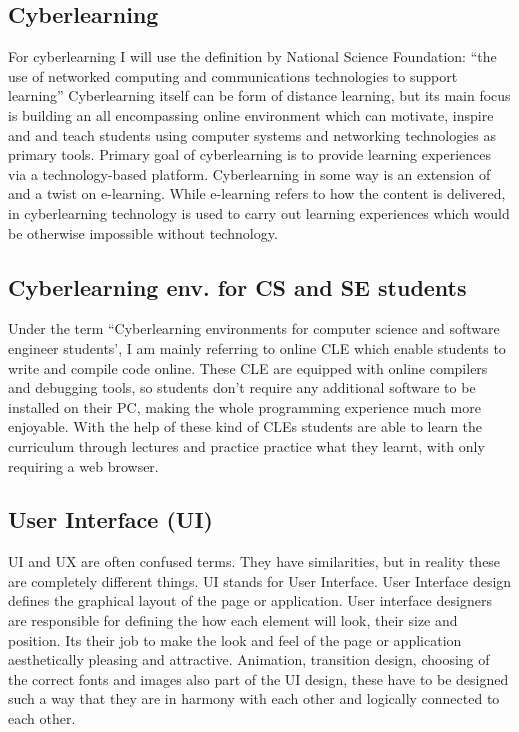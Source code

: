 \documentclass[10pt,twoside,english,a4paper]{article}
\begin{document}
\subsection{Cyberlearning}
For cyberlearning I will use the definition by National Science Foundation: 
``the use of networked computing and communications technologies to support learning” \cite{borgman_2017_fostering} 
Cyberlearning itself can be form of distance learning, but its main focus is building an all 
encompassing online environment which can motivate, inspire and and teach students using 
computer systems and networking technologies as primary tools. \cite{ui/ux}
Primary goal of cyberlearning is to provide learning experiences via a technology-based platform. 
Cyberlearning in some way is an extension of and a twist on e-learning.\cite{lynch_2020_cyberlearning}
While e-learning refers to how the content is delivered, in cyberlearning technology
is used to carry out learning experiences which would be otherwise impossible without technology.\cite{lynch_2020_cyberlearning}

\subsection{Cyberlearning env. for CS and SE students}
Under the term ``Cyberlearning environments for computer science and software engineer students', I am mainly
referring to online CLE which enable students to write and compile code online. These CLE are equipped with 
online compilers and debugging tools, so students don't require any additional software to be installed on their PC, making
the whole programming experience much more enjoyable.
With the help of these kind of CLEs students are able to learn the curriculum through lectures and practice practice
what they learnt, with only requiring a web browser.

\subsection{User Interface (UI)}
UI and UX are often confused terms. \cite{theymakedesign_2019_what} They have similarities, but in reality
these are completely different things.
UI stands for User Interface. User Interface design defines the graphical layout of the page or application.
User interface designers are responsible for defining the how each element will look, their size and position.
Its their job to make the look and feel of the page or application aesthetically pleasing and 
attractive. Animation, transition design, choosing of the correct fonts and images also part of the UI design, 
these have to be designed such a way that they are in harmony with each other and logically connected to each other.
\cite{theymakedesign_2019_what}
\end{document}
